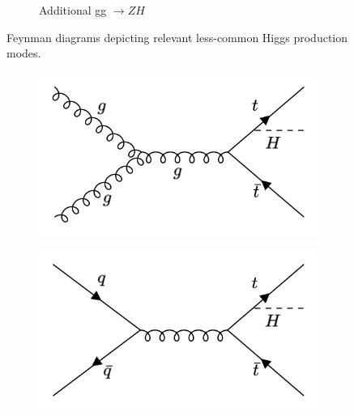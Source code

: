 \begin{figure}[htp]
\begin{subfigure}[b]{0.3\textwidth}
         \caption{Additional gg $\rightarrow ZH$ }
         \label{fig:ggZH}
     \end{subfigure}
  \label{fig:loopmodes}
  \caption{Feynman diagrams depicting relevant less-common Higgs production modes.}  
\end{figure}

\begin{figure}[htp]
  \centering
       \begin{subfigure}[b]{0.3\textwidth}
         \centering
         \includegraphics[width=\textwidth]{figures/theory_chapter/ttH1.png}
         \label{fig:ttH1}
     \end{subfigure}
     \hfill
       \begin{subfigure}[b]{0.3\textwidth}
         \centering
         \includegraphics[width=\textwidth]{figures/theory_chapter/ttH2.png}
         \label{fig:ttH2}
     \end{subfigure}
       \begin{subfigure}[b]{0.3\textwidth}
         \centering

\end{subfigure}
\end{figure}
